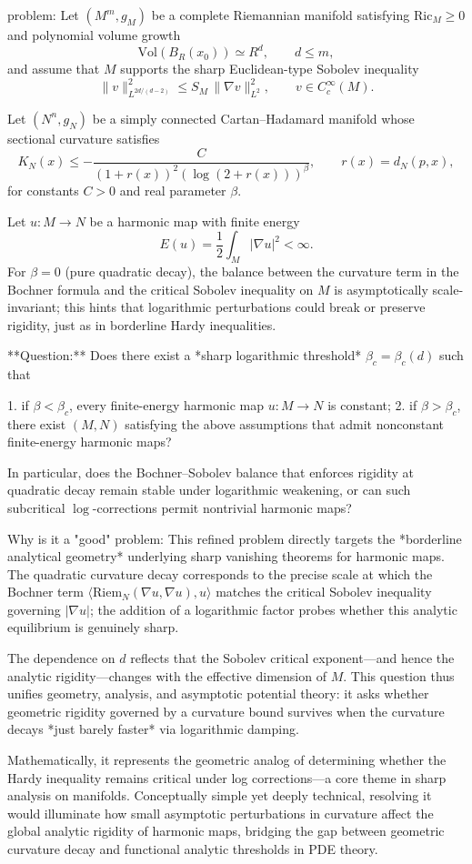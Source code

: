 problem:  
Let \((M^m,g_M)\) be a complete Riemannian manifold satisfying \(\mathrm{Ric}_M \ge 0\) and polynomial volume growth  
\[
\mathrm{Vol}(B_R(x_0)) \simeq R^d, \qquad d \le m,
\]
and assume that \(M\) supports the sharp Euclidean-type Sobolev inequality  
\[
\|v\|_{L^{2d/(d-2)}}^2 \le S_M\,\|\nabla v\|_{L^2}^2, \qquad v\in C_c^\infty(M).
\]

Let \((N^n,g_N)\) be a simply connected Cartan–Hadamard manifold whose sectional curvature satisfies  
\[
K_N(x) \le -\frac{C}{(1+r(x))^2(\log(2+r(x)))^{\beta}}, \qquad r(x)=d_N(p,x),
\]
for constants \(C>0\) and real parameter \(\beta\).

Let \(u:M\to N\) be a harmonic map with finite energy  
\[
E(u) = \frac{1}{2}\int_M |\nabla u|^2 < \infty.
\]
For \(\beta=0\) (pure quadratic decay), the balance between the curvature term in the Bochner formula and the critical Sobolev inequality on \(M\) is asymptotically scale‐invariant; this hints that logarithmic perturbations could break or preserve rigidity, just as in borderline Hardy inequalities.

**Question:**  
Does there exist a *sharp logarithmic threshold* \(\beta_c = \beta_c(d)\) such that

1. if \(\beta < \beta_c\), every finite-energy harmonic map \(u:M\to N\) is constant;  
2. if \(\beta > \beta_c\), there exist \((M,N)\) satisfying the above assumptions that admit nonconstant finite-energy harmonic maps?

In particular, does the Bochner–Sobolev balance that enforces rigidity at quadratic decay remain stable under logarithmic weakening, or can such subcritical \(\log\)-corrections permit nontrivial harmonic maps?

Why is it a "good" problem:  
This refined problem directly targets the *borderline analytical geometry* underlying sharp vanishing theorems for harmonic maps. The quadratic curvature decay corresponds to the precise scale at which the Bochner term \(\langle \mathrm{Riem}_N(\nabla u,\nabla u),u\rangle\) matches the critical Sobolev inequality governing \(|\nabla u|\); the addition of a logarithmic factor probes whether this analytic equilibrium is genuinely sharp.  

The dependence on \(d\) reflects that the Sobolev critical exponent—and hence the analytic rigidity—changes with the effective dimension of \(M\). This question thus unifies geometry, analysis, and asymptotic potential theory: it asks whether geometric rigidity governed by a curvature bound survives when the curvature decays *just barely faster* via logarithmic damping.  

Mathematically, it represents the geometric analog of determining whether the Hardy inequality remains critical under log corrections—a core theme in sharp analysis on manifolds. Conceptually simple yet deeply technical, resolving it would illuminate how small asymptotic perturbations in curvature affect the global analytic rigidity of harmonic maps, bridging the gap between geometric curvature decay and functional analytic thresholds in PDE theory.
